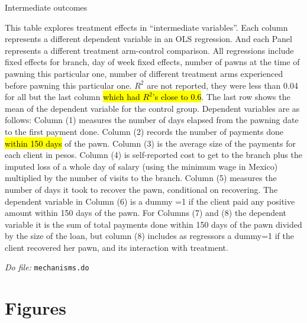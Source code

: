 \documentclass[11pt]{article}
\begin{document}
\begin{table}[H]
\caption{Intermediate outcomes}
\label{mechanisms}
\begin{center}
\scriptsize{}
\end{center}
 \scriptsize
This table explores treatment effects in ``intermediate variables''. Each column represents a different dependent variable in an OLS regression. And each Panel represents a different treatment arm-control comparison. All regressions include fixed effects for branch, day of week fixed effects, number of pawns at the time of pawning this particular one, number of different treatment arms experienced before pawning this particular one. $R^2$ are not reported, they were less than 0.04 for all but the last column \hl{which had $R^2$'s close to 0.6}. The last row shows the mean of the dependent variable for the control group. Dependent variables are as follows: Column (1) measures the number of days elapsed from the pawning date to the first payment done. Column (2) records the number of payments done \hl{within 150 days} of the pawn. Column (3) is the average size of the payments for each client in pesos. Column (4) is self-reported cost to get to the branch plus the imputed loss of a whole day of salary (using the minimum wage in Mexico) multiplied by the number of visits to the branch. Column (5) measures the number of days it took to recover the pawn, conditional on recovering. The dependent variable in Column (6) is a dummy =1 if the client paid any positive amount within 150 days of the pawn. For Columns (7) and (8) the dependent variable it is the sum of total payments done within 150 days of the pawn divided by the size of the loan, but column (8) includes as regressors a dummy=1 if the client recovered her pawn, and its interaction with treatment.

\textit{Do file: } \texttt{mechanisms.do}
\end{table}


\section{Figures}
\end{document}
